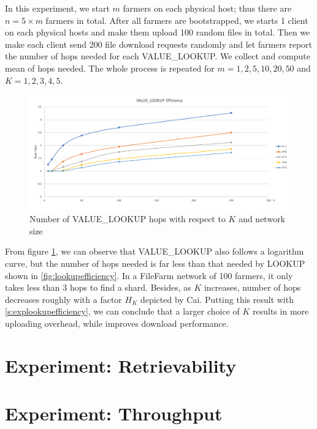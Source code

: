 In this experiment, we start $m$ farmers on each physical host; thus there are $n = 5 \times m$ farmers in total. After all farmers are bootstrapped, we starts 1 client on each physical hosts and make them upload 100 random files in total. Then we make each client send 200 file download requests randomly and let farmers report the number of hops needed for each VALUE\_LOOKUP. We collect and compute mean of hops needed. The whole process is repeated for $m=1,2,5,10,20,50$ and $K=1,2,3,4,5$.

\begin{figure}[hbt]
\centering
  \includegraphics[width=14cm]{charts/chart_value_lookup_efficiency.png}
  \caption{Number of VALUE\_LOOKUP hops with respect to $K$ and network size}
  \label{fig:valuelookupefficiency}
\end{figure}

From figure \ref{fig:valuelookupefficiency}, we can observe that VALUE\_LOOKUP also follows a logarithm curve, but the number of hops needed is far less than that needed by LOOKUP shown in \ref{fig:lookupefficiency}. In a FileFarm network of 100 farmers, it only takes less than 3 hops to find a shard. Besides, as $K$ increases, number of hops decreases roughly with a factor $H_{K}$ depicted by Cai\cite{cai2013probabilistic}. Putting this result with \ref{s:explookupefficiency}, we can conclude that a larger choice of $K$ results in more uploading overhead, while improves download performance.

\section{Experiment: Retrievability}
\label{s:expretrievability}

\section{Experiment: Throughput}
\label{s:expthroughput}

